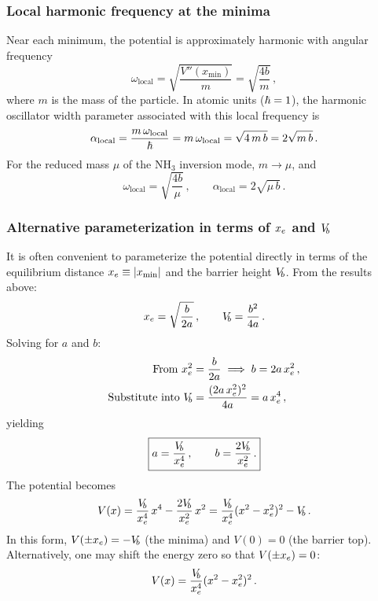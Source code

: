 \subsubsection{Local harmonic frequency at the minima}

Near each minimum, the potential is approximately harmonic with angular frequency
\begin{equation}
  \omega_{\text{local}} = \sqrt{\frac{V''(x_{\min})}{m}} = \sqrt{\frac{4b}{m}}\,,
\end{equation}
where $m$ is the mass of the particle. In atomic units ($\hbar = 1$), the harmonic oscillator width parameter associated with this local frequency is
\begin{equation}\label{eq:alpha_local}
  \alpha_{\text{local}} = \frac{m\,\omega_{\text{local}}}{\hbar} = m\,\omega_{\text{local}} = \sqrt{4\,m\,b} = 2\sqrt{m\,b}\,.
\end{equation}
For the reduced mass $\mu$ of the NH$_3$ inversion mode, $m \to \mu$, and
\begin{equation}
  \boxed{\omega_{\text{local}} = \sqrt{\frac{4b}{\mu}}\,,\qquad
  \alpha_{\text{local}} = 2\sqrt{\mu\,b}\,.}
\end{equation}

\subsubsection{Alternative parameterization in terms of $x_e$ and $V_{\!b}$}

It is often convenient to parameterize the potential directly in terms of the
equilibrium distance $x_e \equiv |x_{\min}|$ and the barrier height $V_{\!b}$.
From the results above:
\begin{equation}
  x_e = \sqrt{\frac{b}{2a}}\,,\qquad V_{\!b} = \frac{b^2}{4a}\,.
\end{equation}
Solving for $a$ and $b$:
\begin{align}
  \text{From }x_e^2 &= \frac{b}{2a} \implies b = 2a\,x_e^2\,,\\
  \text{Substitute into }V_{\!b} &= \frac{(2a\,x_e^2)^2}{4a} = a\,x_e^4\,,
\end{align}
yielding
\begin{equation}\label{eq:ab_from_xeVb}
  \boxed{a = \frac{V_{\!b}}{x_e^4}\,,\qquad b = \frac{2V_{\!b}}{x_e^2}\,.}
\end{equation}
The potential becomes
\begin{equation}\label{eq:V_xeVb}
  V(x) = \frac{V_{\!b}}{x_e^4}\,x^4 - \frac{2V_{\!b}}{x_e^2}\,x^2
  = \frac{V_{\!b}}{x_e^4}(x^2 - x_e^2)^2 - V_{\!b}\,.
\end{equation}
In this form, $V(\pm x_e) = -V_{\!b}$ (the minima) and $V(0) = 0$ (the barrier top).
Alternatively, one may shift the energy zero so that $V(\pm x_e) = 0$:
\begin{equation}\label{eq:V_xeVb_shifted}
  V(x) = \frac{V_{\!b}}{x_e^4}(x^2 - x_e^2)^2\,.
\end{equation}

